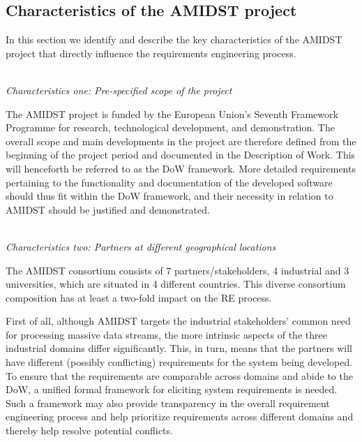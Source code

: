 \subsection{Characteristics of the AMIDST project}
\label{sec:characteristics}

In this section we identify and describe the key characteristics of the AMIDST project that directly influence the 
requirements
engineering process. 

\ \\
\noindent \emph{Characteristics one:  Pre-specified scope of the project}
\label{sec:characteristic1}

The AMIDST project is funded by the European Union's Seventh Framework Programme for research, technological
development, and demonstration. The overall scope and main developments in the project are therefore defined from the
beginning of the project period and documented in the Description of Work. This will henceforth be referred to
as the DoW framework. More detailed requirements pertaining
to the functionality and documentation of the developed software should thus fit within the DoW framework, and their
necessity in relation to AMIDST should be justified and demonstrated.   


 

\ \\
\noindent \emph{Characteristics two: Partners at different geographical locations}
\label{sec:characteristic2}

The AMIDST consortium consists of 7 partners/stakeholders, 4 industrial and 3 universities, which are situated in 4 different
countries. This diverse consortium composition has at least a two-fold impact on the RE process.

First of
all, although AMIDST targets the industrial stakeholders' common need for processing massive data streams, the more
intrinsic aspects of the three industrial domains differ significantly. This, in turn, means that the partners will have different
(possibly conflicting) requirements for the system being developed. To ensure that the requirements are comparable
across domains and abide to the DoW, a unified formal framework for eliciting system requirements is needed. Such a
framework may also provide transparency in the overall requirement engineering process and help prioritize requirements
across different domains and thereby help resolve potential conflicts.   

